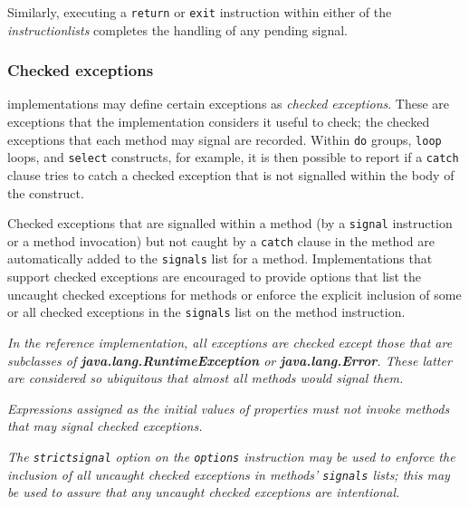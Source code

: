 Similarly, executing a \texttt{return}
or \texttt{exit} instruction within either of the
\emph{instructionlists} completes the handling of any pending
signal.
\subsubsection{Checked exceptions}\label{refchecked}
 
\nr{} implementations may define certain exceptions as \emph{checked
exceptions}.  These are exceptions that the implementation considers
it useful to check; the checked exceptions that each method may signal
are recorded.  Within \texttt{do} groups, \texttt{loop} loops, and
\texttt{select} constructs, for example, it is then possible to report
if a \texttt{catch} clause tries to catch a checked exception that is
not signalled within the body of the construct.
 
Checked exceptions that are signalled within a method (by a
\texttt{signal} instruction or a method invocation) but not caught by a
\texttt{catch} clause in the method are automatically added to the
\texttt{signals} list for a method.  Implementations that support
checked exceptions are encouraged to provide options that list the
uncaught checked exceptions for methods or enforce the explicit
inclusion of some or all checked exceptions in the \texttt{signals} list
on the method instruction.
 
\emph{In the reference implementation, all exceptions are checked except
those that are subclasses of \textbf{java.lang.RuntimeException}
or \textbf{java.lang.Error}.  These latter are considered so
ubiquitous that almost all methods would signal them.}
 
\emph{Expressions assigned as the initial values of properties must not invoke
methods that may signal checked exceptions.}
 
\emph{The \texttt{strictsignal} option on the \texttt{options} instruction may
be used to enforce the inclusion of all uncaught checked exceptions in
methods' \texttt{signals} lists; this may be used to assure that
any uncaught checked exceptions are intentional.}
